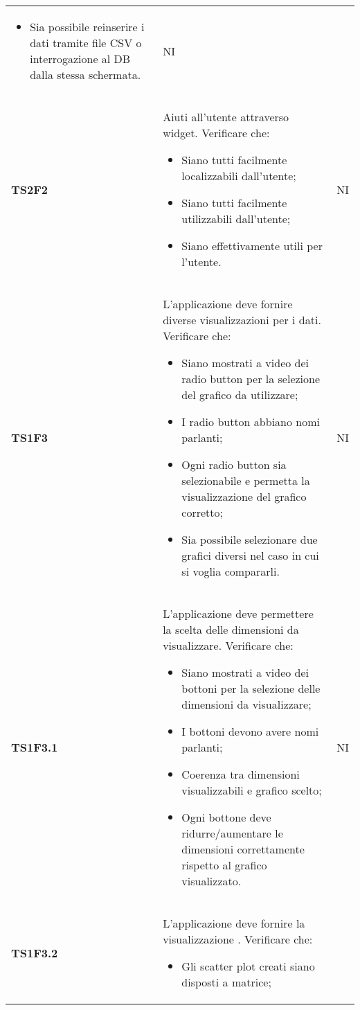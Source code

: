 \begin{longtable}{C{2.5cm} | C{12cm} C{2cm}}
\begin{itemize}
						\item Sia possibile reinserire i dati tramite file CSV o interrogazione al DB dalla stessa schermata.
					\end{itemize}	
 				 & NI \\ 
\textbf{TS2F2} &  Aiuti all'utente attraverso widget. Verificare che:
					\begin{itemize}
						\item Siano tutti facilmente localizzabili dall'utente;
						\item Siano tutti facilmente utilizzabili dall'utente;
						\item Siano effettivamente utili per l'utente.
					\end{itemize}	
 			   & NI \\ 
\textbf{TS1F3} &  L'applicazione deve fornire diverse visualizzazioni per i dati. Verificare che: 
					\begin{itemize}
						\item Siano mostrati a video dei radio button per la selezione del grafico da utilizzare;
						\item I radio button abbiano nomi parlanti;
						\item Ogni radio button sia selezionabile e permetta la visualizzazione del grafico corretto;
						\item Sia possibile selezionare due grafici diversi nel caso in cui si voglia compararli.
					\end{itemize}
			   &  NI \\
\textbf{TS1F3.1} & L'applicazione deve permettere la scelta delle dimensioni da visualizzare. Verificare che:
 					\begin{itemize}
 						\item Siano mostrati a video dei bottoni per la selezione delle dimensioni da visualizzare;
 						\item I bottoni devono avere nomi parlanti;
 						\item Coerenza tra dimensioni visualizzabili e grafico scelto;
 						\item Ogni bottone deve ridurre/aumentare le dimensioni correttamente rispetto al grafico visualizzato.
 					\end{itemize}
           	     & NI \\
\textbf{TS1F3.2} & L'applicazione deve fornire la visualizzazione . Verificare che:
					\begin{itemize}
						\item Gli scatter plot creati siano disposti a matrice;

\end{itemize}
\end{longtable}
